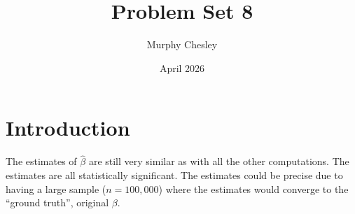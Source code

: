 \documentclass{article}
\title{Problem Set 8}
\author{Murphy Chesley}
\date{April 2026}
\begin{document}
\maketitle

\section{Introduction}

The estimates of $\hat{\beta}$ are still very similar as with all the other computations. 
The estimates are all statistically significant. The estimates could be precise due to 
having a large sample ($n=100,000$) where the estimates would converge to the ``ground truth'', original $\beta$.


\end{document}
